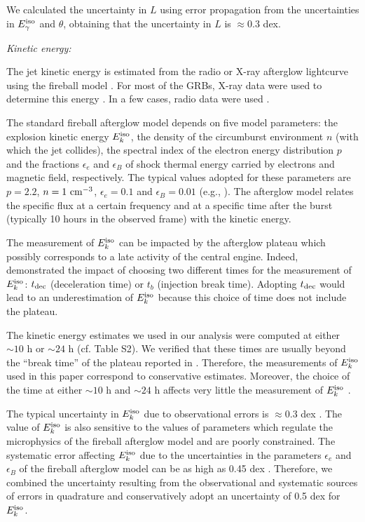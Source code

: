 \documentclass[12pt]{article}
\begin{document}
We calculated the uncertainty in $L$ using error propagation from the uncertainties in $E_\gamma^{\rm iso}$ and $\theta$, obtaining that the uncertainty in $L$ is $\approx 0.3$ dex.



\emph{Kinetic energy:}

The jet kinetic energy is estimated from the radio or X-ray afterglow lightcurve using the fireball model \cite{sfreedman01}. For most of the GRBs, X-ray data were used to determine this energy \cite{slz04,sracusin11}. In a few cases, radio data were used \cite{ssode04, ssode04apj, scenko12}.

The standard fireball afterglow model depends on five model parameters: the explosion kinetic energy $E_k^{\rm iso}$, the density of the circumburst environment $n$ (with which the jet collides), the spectral index of the electron energy distribution $p$ and the fractions $\epsilon_e$ and $\epsilon_B$ of shock thermal energy carried by electrons and magnetic field, respectively. The typical values adopted for these parameters are $p=2.2$, $n=1 \ {\rm cm}^{-3}$, $\epsilon_e=0.1$ and $\epsilon_B=0.01$ (e.g., \emph{}). 
The afterglow model relates the specific flux at a certain frequency and at a specific time after the burst (typically 10 hours in the observed frame) with the kinetic energy. 

The measurement of $E_k^{\rm iso}$ can be impacted by the afterglow plateau which possibly corresponds to a late activity of the central engine. Indeed, \cite{szhang07} demonstrated the impact of choosing two different times for the measurement of $E_k^{\rm iso}$: $t_{\rm dec}$ (deceleration time) or $t_b$ (injection break time). Adopting $t_{\rm dec}$ would lead to an underestimation of $E_k^{\rm iso}$ because this choice of time does not include the plateau.

The kinetic energy estimates we used in our analysis were computed at either $\sim 10$ h or $\sim 24$ h (cf. Table S2). We verified that these times are usually beyond the ``break time'' of the plateau reported in \cite{sdainotti10}. Therefore, the measurements of $E_k^{\rm iso}$ used in this paper correspond to conservative estimates. Moreover, the choice of the time at either $\sim 10$ h and $\sim 24$ h affects very little the measurement of $E_k^{\rm iso}$ \cite{sracusin11}.

The typical uncertainty in $E_k^{\rm iso}$ due to observational errors is $\approx 0.3$ dex \cite{slz04,szhang07}. The value of $E_k^{\rm iso}$ is also sensitive to the values of parameters which regulate the microphysics of the fireball afterglow model and are poorly constrained. The systematic error affecting $E_k^{\rm iso}$ due to the uncertainties in the parameters $\epsilon_e$ and $\epsilon_B$ of the fireball afterglow model can be as high as 0.45 dex \cite{sfan06, szhang07}. Therefore, we combined the uncertainty resulting from the observational and systematic sources of errors in quadrature and conservatively adopt an uncertainty of 0.5 dex for $E_k^{\rm iso}$.
\end{document}

